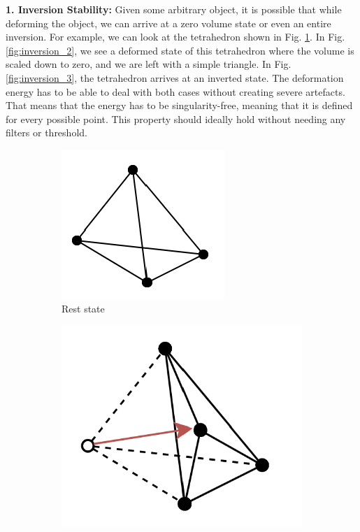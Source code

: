 {\textbf{1. Inversion Stability:} Given some arbitrary object, it is possible that while deforming the object, we can arrive at a zero volume state or even an entire inversion. For example, we can look at the tetrahedron shown in Fig. \ref{fig:inversion_1}. In Fig. \ref{fig:inversion_2}, we see a deformed state of this tetrahedron where the volume is scaled down to zero, and we are left with a simple triangle. In Fig. \ref{fig:inversion_3}, the tetrahedron arrives at an inverted state. The deformation energy has to be able to deal with both cases without creating severe artefacts. That means that the energy has to be singularity-free, meaning that it is defined for every possible point. This property should ideally hold without needing any filters or threshold.
\begin{figure}[!ht]
\centering
\begin{subfigure}{.3\textwidth}
  \centering
  \includegraphics[width=.8\linewidth]{resources/stability_inversion_1.png}  
  \caption{Rest state}
  \label{fig:inversion_1}
\end{subfigure}
\begin{subfigure}{.3\textwidth}
  \centering
  \includegraphics[width=.9\linewidth]{resources/stability_inversion_2.png}  

\end{subfigure}
\end{figure}}
